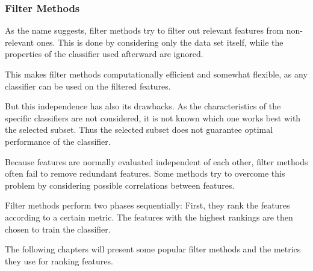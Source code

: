\subsubsection{Filter Methods}
\label{sec:methods.flat.filter}


As the name suggests, filter methods try to filter out relevant features from
non-relevant ones. This is done by considering only the data set itself, while
the properties of the classifier used afterward are ignored.
 
This makes filter methods computationally efficient and somewhat flexible, 
as any classifier can be used on the filtered features.  

But this independence has also its drawbacks. As the characteristics of the 
specific classifiers are not considered, it is not known which one works 
best with the selected subset. Thus the selected subset does not guarantee optimal 
performance of the classifier.

Because features are normally evaluated independent of each other, filter methods often
fail to remove redundant features. Some methods try to overcome this problem by 
considering possible correlations between features.

Filter methods perform two phases sequentially: First, they rank the features according 
to a certain metric. The features with the highest rankings are then chosen to train the
classifier. 

The following chapters will present some popular filter methods and the metrics they use
for ranking features.



